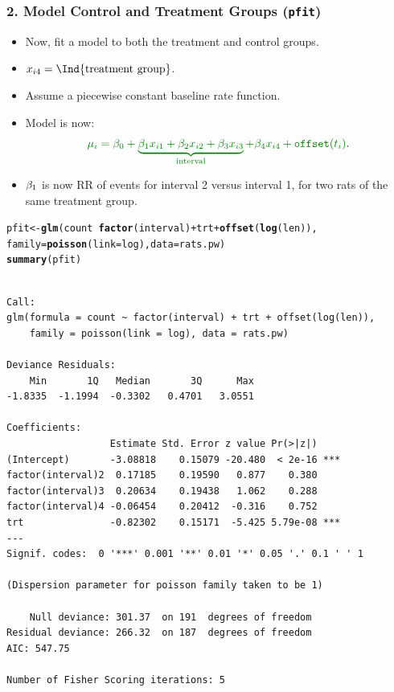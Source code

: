 \documentclass[oneside]{book}\usepackage[]{graphicx}\usepackage[svgnames]{xcolor}
\makeatletter
\newcommand{\hlopt}[1]{\textcolor[rgb]{0,0,0}{#1}}%
\newcommand{\hlstd}[1]{\textcolor[rgb]{0.345,0.345,0.345}{#1}}%
\newcommand{\hlkwb}[1]{\textcolor[rgb]{0.69,0.353,0.396}{#1}}%
\newcommand{\hlkwc}[1]{\textcolor[rgb]{0.333,0.667,0.333}{#1}}%
\newcommand{\hlkwd}[1]{\textcolor[rgb]{0.737,0.353,0.396}{\textbf{#1}}}%
\newenvironment{kframe}{%
 \def\at@end@of@kframe{}%
 \ifinner\ifhmode%
  \def\at@end@of@kframe{\end{minipage}}%
  \begin{minipage}{\columnwidth}%
 \fi\fi%
 \def\FrameCommand##1{\hskip\@totalleftmargin \hskip-\fboxsep
 \colorbox{shadecolor}{##1}\hskip-\fboxsep
     \hskip-\linewidth \hskip-\@totalleftmargin \hskip\columnwidth}%
 \MakeFramed {\advance\hsize-\width
   \@totalleftmargin\z@ \linewidth\hsize
   \@setminipage}}%
 {\par\unskip\endMakeFramed%
 \at@end@of@kframe}
\newenvironment{knitrout}{}{} %
\let\exp\relax%
\let\log\relax%
\makeatother
\begin{document}
\subsubsection*{2. Model Control and Treatment Groups (\texttt{pfit})}
\begin{itemize}
    \item Now, fit a model to both the treatment and control groups.
    \item $ x_{i4}=\Ind{\text{treatment group}} $.
    \item Assume a piecewise constant baseline rate function.
    \item Model is now:
          \[ \textcolor{Green}{\log{\mu_i}=\beta_0+\underbrace{\beta_1x_{i1}+\beta_2x_{i2}+\beta_3x_{i3}}_{\text{interval}}+\beta_4x_{i4}+\texttt{offset}(\log{t_i})}. \]
    \item $ \exp{\beta_1} $ is now RR of events for interval 2 versus interval 1, for two rats of the
          same treatment group.
\end{itemize}
\begin{knitrout}
\color{fgcolor}\begin{kframe}
\begin{alltt}
\hlstd{pfit} \hlkwb{<-} \hlkwd{glm}\hlstd{(count} \hlopt{~} \hlkwd{factor}\hlstd{(interval)} \hlopt{+} \hlstd{trt} \hlopt{+} \hlkwd{offset}\hlstd{(}\hlkwd{log}\hlstd{(len)),}
  \hlkwc{family} \hlstd{=} \hlkwd{poisson}\hlstd{(}\hlkwc{link} \hlstd{= log),} \hlkwc{data} \hlstd{= rats.pw)}
\hlkwd{summary}\hlstd{(pfit)}
\end{alltt}
\begin{verbatim}

Call:
glm(formula = count ~ factor(interval) + trt + offset(log(len)), 
    family = poisson(link = log), data = rats.pw)

Deviance Residuals: 
    Min       1Q   Median       3Q      Max  
-1.8335  -1.1994  -0.3302   0.4701   3.0551  

Coefficients:
                  Estimate Std. Error z value Pr(>|z|)    
(Intercept)       -3.08818    0.15079 -20.480  < 2e-16 ***
factor(interval)2  0.17185    0.19590   0.877    0.380    
factor(interval)3  0.20634    0.19438   1.062    0.288    
factor(interval)4 -0.06454    0.20412  -0.316    0.752    
trt               -0.82302    0.15171  -5.425 5.79e-08 ***
---
Signif. codes:  0 '***' 0.001 '**' 0.01 '*' 0.05 '.' 0.1 ' ' 1

(Dispersion parameter for poisson family taken to be 1)

    Null deviance: 301.37  on 191  degrees of freedom
Residual deviance: 266.32  on 187  degrees of freedom
AIC: 547.75

Number of Fisher Scoring iterations: 5
\end{verbatim}
\end{kframe}
\end{knitrout}
\end{document}
